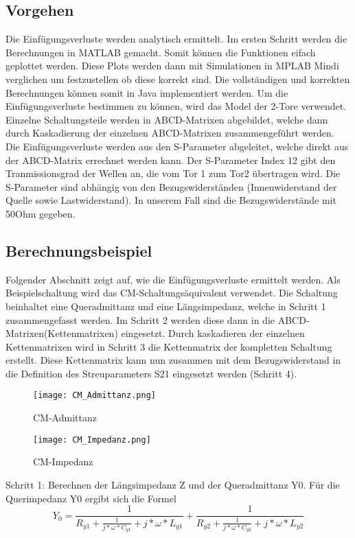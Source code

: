 \subsection{Vorgehen} \label{subsec:vorgehen}
Die Einfügungsverluste werden analytisch ermittelt. Im ersten Schritt werden die Berechnungen in MATLAB gemacht. Somit können die Funktionen eifach geplottet werden. Diese Plots werden dann mit Simulationen in MPLAB Mindi verglichen um festzustellen ob diese korrekt sind. Die vollständigen und korrekten Berechnungen können somit in Java implementiert werden. Um die Einfügungsverluste bestimmen zu können, wird das Model der 2-Tore verwendet. Einzelne Schaltungsteile werden in ABCD-Matrixen abgebildet, welche dann durch Kaskadierung der einzelnen ABCD-Matrixen zusammengeführt werden. Die Einfügungsverluste werden aus den S-Parameter abgeleitet, welche direkt aus der ABCD-Matrix errechnet werden kann.
Der S-Parameter Index 12 gibt den Tranmissionsgrad der Wellen an, die vom Tor 1 zum Tor2 übertragen wird. Die S-Parameter sind abhängig von den Bezugswiderständen (Innenwiderstand der Quelle sowie Lastwiderstand). In unserem Fall sind die Bezugswiderstände mit 50Ohm gegeben.

\newpage
\subsection{Berechnungsbeispiel} \label{subsec:beispiel}
Folgender Abschnitt zeigt auf, wie die Einfügungsverluste ermittelt werden. Als Beispielschaltung wird das CM-Schaltungsäquivalent verwendet. Die Schaltung beinhaltet eine Queradmittanz und eine Längsimpedanz, welche in Schritt 1 zusammengefasst werden. Im Schritt 2 werden diese dann in die ABCD-Matrixen(Kettenmatrixen) eingesetzt. Durch kaskadieren der einzelnen Kettenmatrixen wird in Schritt 3 die Kettenmatrix der kompletten Schaltung erstellt. Diese Kettenmatrix kann nun zusammen mit dem Bezugswiderstand in die Definition des Streuparameters S21 eingesetzt werden (Schritt 4).

\begin{figure}[H]
	\centering
	\texttt{[image: CM\_Admittanz.png]}
	\caption{CM-Admittanz}
	\label{fig:CM-Admittanz}
\end{figure}
\begin{figure}[H]
	\centering
	\texttt{[image: CM\_Impedanz.png]}
	\caption{CM-Impedanz}
	\label{fig:CM-Impedanz}
\end{figure}
Schritt 1: Berechnen der Längsimpedanz Z und der Queradmittanz Y0.
Für die Querimpedanz Y0 ergibt sich die Formel
\begin{equation}
Y_0 = \frac{ 1 }{R_{y1} + \frac{1}{j*\omega*C_{y1}}+j*\omega*L_{y1}} +\frac{ 1 }{R_{y2} + \frac{1}{j*\omega*C_{y2}}+j*\omega*L_{y2}}
\end{equation}

